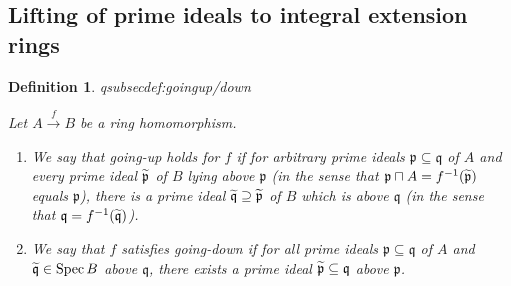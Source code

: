 \documentclass[DIV=14,parskip=full,pointednumbers]{scrartcl}
\newenvironment{alphanumerate}{\begin{enumerate}[label={$(\alph*)$},ref=\curthm]}{\end{enumerate}}
\theoremstyle{cthm}
\theoremstyle{cvarthm}
\theoremstyle{cdef}
\newtheorem{defi}{Definition}[subsection]
\newcommand{\lbl}[1]{
	\label{#1}
	\ifmmode
	\expandafter\xdef\csname eqsubsec#1\endcsname{\thesubsection}
	\fi
}
\newcommand{\pp}{\mathfrak{p}}
\newcommand{\qq}{\mathfrak{q}}
\newcommand{\Spec}{\operatorname{Spec}}
\newcommand{\longto}{\longrightarrow}
\newcommand{\snake}[1]{\widetilde{#1}\vphantom{\overrightarrow{#1}}}%
\newcommand{\morphism}[1][]{\overset{#1}{\longto}}
\begin{document}
\subsection{Lifting of prime ideals to integral extension rings}
	\begin{defi}\lbl{def:goingup/down}
		Let $A\morphism[f]B$ be a ring homomorphism.
		\begin{alphanumerate}
			\item We say that \emph{going-up} holds for $f$ if for arbitrary prime ideals $\pp\subseteq \qq$ of $A$ and every prime ideal $\snake \pp$ of $B$ lying \emph{above} $\pp$ (in the sense that $\pp\sqcap A=f^{-1}(\snake \pp)$ equals $\pp$), there is a prime ideal $\snake \qq\supseteq\snake \pp$ of $B$ which is above $\qq$ (in the sense that $\qq=f^{-1}(\snake\qq)$).
			\item We say that $f$ satisfies \emph{going-down} if for all prime ideals $\pp\subseteq\qq$ of $A$ and $\snake \qq\in\Spec B$ above $\qq$, there exists a prime ideal $\snake \pp\subseteq\qq$ above $\pp$.
		\end{alphanumerate}
	\end{defi}
\end{document}
